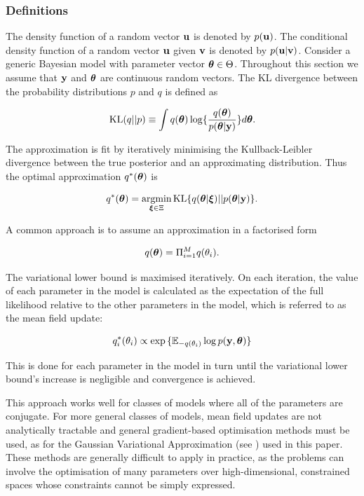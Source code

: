 \documentclass[times, doublespace]{anzsauth}
\begin{document}
\subsubsection{Definitions}

The density function of a random vector ${\bf u}$ is denoted by $p({\bf u})$.  The conditional density function of a
random vector ${\bf u}$ given ${\bf v}$ is denoted by $p({\bf u}|{\bf v})$. Consider a generic Bayesian model with parameter
vector ${\boldsymbol \theta} \in \Theta$. Throughout this section we assume that ${\bf y}$ and ${\boldsymbol \theta}$ are continuous random
vectors. The KL divergence between the probability distributions $p$ and $q$ is defined as

$$
\text{KL}(q || p) \equiv \int q({\boldsymbol \theta}) \log \{ \frac{q({\boldsymbol \theta})}{p({\boldsymbol \theta} | {\bf y})} \} d {\boldsymbol \theta}.
$$

\noindent The approximation is fit by iteratively minimising the Kullback-Leibler divergence between the true
posterior and an approximating distribution. Thus the optimal approximation $q^*({\boldsymbol \theta})$ is

$$
q^*(\vtheta) = \argmin_{\vxi \in \Xi} \text{KL} \{ {q(\vtheta|\vxi) || p(\vtheta|\vy)} \}.
$$

\noindent A common approach is to assume an approximation in a factorised form

$$q({\boldsymbol \theta}) = \Pi_{i=1}^M q(\theta_i).$$

\noindent The variational lower bound is maximised iteratively. On each iteration, the value of each parameter
in the model is calculated as the expectation of the full likelihood relative to the other parameters in the
model, which is referred to as the mean field update:

$$q_i^*(\theta_i) \propto \exp{\{ {\mathbb E}_{-q(\theta_i)} \log p({\bf y}, {\boldsymbol\theta}) \}}$$

\noindent This is done for each parameter in the model in turn until the variational lower bound's increase is
negligible and convergence is achieved.

\noindent This approach works well for classes of models where all of the parameters are conjugate. For more
general classes of models, mean field updates are not analytically tractable and general gradient-based
optimisation methods must be used, as for the Gaussian Variational Approximation (see \cite{ormerod09}) used
in this paper. These methods are generally difficult to apply in practice, as the problems can involve the
optimisation of many parameters over high-dimensional, constrained spaces whose constraints cannot be simply
expressed.
\end{document}

